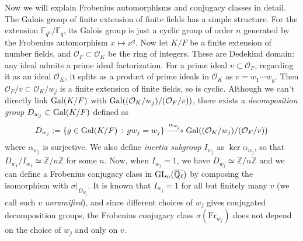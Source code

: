 Now we will explain Frobenius automorphisms and conjugacy classes in detail.
The Galois group of finite extension of finite fields has a simple structure.
For the extension $\mathbb{F}_{q^{n}} /\mathbb{F}_{q}$, its Galois group is just
a cyclic group of order $n$ generated by the Frobenius automorphism $x \mapsto x^{q}$.
Now let $K/F$ be a finite extension of number fields, and $\mathcal{O}_{F} \subset \mathcal{O}_{K}$ be the ring of integers.
These are Dedekind domain: any ideal admits a prime ideal factorization.
For a prime ideal $v \subset \mathcal{O}_{F}$, regarding it as an ideal $\mathcal{O}_{K}$, it splits as a
product of prime ideals in $\mathcal{O}_{K}$ as $v = w_{1}\cdots w_{g}$.
Then $\mathcal{O}_{F}/v \subset \mathcal{O}_{K} / w_{j}$ is a finite extension of finite fields, so is cyclic.
Although we can't directly link $\operatorname{\mathrm{Gal}}(K/F)$ with $\operatorname{\mathrm{Gal}}((\mathcal{O}_{K}/w_{j})/(\mathcal{O}_{F}/v))$, there exists
a \emph{decomposition group} $D_{w_{j}} \subset \operatorname{\mathrm{Gal}}(K/F)$ defined as
$$
    D_{w_{j}}:=\{g \in \operatorname{\mathrm{Gal}}(K/F)\,:\, gw_{j} = w_{j}\} \xrightarrow{\alpha_{w_{j}}} \operatorname{\mathrm{Gal}}((\mathcal{O}_{K}/w_{j})/(\mathcal{O}_{F}/v))
$$
where $\alpha_{w_j}$ is surjective.
We also define \emph{inertia subgroup} $I_{w_{j}}$ as $\ker \alpha_{w_{j}}$, so that $D_{w_{1}}/I_{w_{1}} \simeq \mathbb{Z}/n\mathbb{Z}$
for some $n$.
Now, when $I_{w_{j}} = 1$, we have $D_{w_{j}} \simeq \mathbb{Z}/n\mathbb{Z}$ and we can define a Frobenius
conjugacy class in $\operatorname{\mathrm{GL}}_{n}(\overline{\mathbb{Q}_{\ell}})$ by composing the isomorphism with $\sigma|_{D_{w_{j}}}$.
It is known that $I_{w_{j}} = 1$ for all but finitely many $v$ (we call such $v$ \emph{unramified}),
and since different choices of $w_{j}$ gives conjugated decomposition groups,
the Frobenius conjugacy class $\sigma(\mathrm{Fr}_{w_{j}})$ does not depend on the choice of $w_{j}$ and only on $v$. 